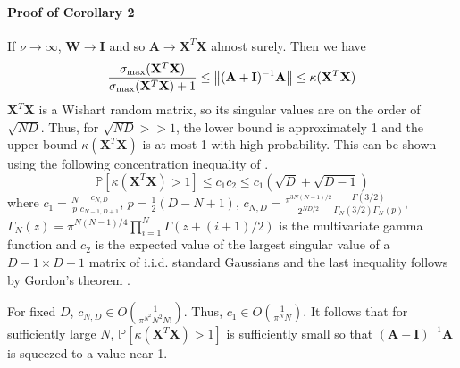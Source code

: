 \documentclass[mnsc,blindrev]{informs3}
\begin{document}
    
        \paragraph{Proof of Corollary 2}
            If $\nu \rightarrow \infty$, $\mathbf{W} \rightarrow \mathbf{I}$ and so $\mathbf{A} \rightarrow \mathbf{X}^T \mathbf{X}$ almost surely. Then we have 
            \begin{equation*}
                \frac{\sigma_{\max}(\mathbf{X}^T \mathbf{X})}{\sigma_{\max}(\mathbf{X}^T \mathbf{X})+1} \leq \norm{(\mathbf{A} + \mathbf{I})^{-1}\mathbf{A}} \leq  \kappa(\mathbf{X}^T \mathbf{X})%
            \end{equation*}
            $\mathbf{X}^T \mathbf{X}$ is a Wishart random matrix, so its singular values are on the order of $\sqrt{ND}$. Thus, for $\sqrt{ND} >> 1$, the lower bound is approximately 1 and the upper bound  $\kappa(\mathbf{X}^T \mathbf{X})$ is at most 1 with high probability.  
            This can be shown using the following concentration inequality of \citep{edelman2005tails}.
            \begin{equation*}
                \mathds{P}[\kappa(\mathbf{X}^T \mathbf{X}) > 1] \leq c_1 c_2 \leq c_1 (\sqrt{D} + \sqrt{D-1})%
            \end{equation*}
            where $c_1 = \frac{N}{p} \frac{c_{N,D}}{c_{N-1,D+1}}$, $p=\frac{1}{2}(D-N+1)$, $c_{N,D} = \frac{\pi^{3N(N-1)/2}}{2^{ND/2}} \frac{\Gamma(3/2)}{\Gamma_N(3/2)\Gamma_N(p)}$, $\Gamma_N(z) = \pi^{N(N-1)/4} \prod_{i=1}^N \Gamma(z + (i+1)/2)$ is the multivariate gamma function and $c_2$ is the expected value of the largest singular value of a $D-1\times D+1$ matrix of i.i.d. standard Gaussians and the last inequality follows by Gordon's theorem \citep{vershynin2012introduction}.
    
            For fixed $D$, $c_{N,D} \in O\left(\frac{1}{\pi^{N^2} N^2 N!}\right)$. Thus, $c_1 \in O\left(\frac{1}{\pi^{N}N}\right)$. It follows that for sufficiently large $N$, $\mathds{P}[\kappa(\mathbf{X}^T \mathbf{X}) > 1]$ is sufficiently small so that $(\mathbf{A} + \mathbf{I})^{-1}\mathbf{A}$ is squeezed to a value near 1. %
    
\end{document}
